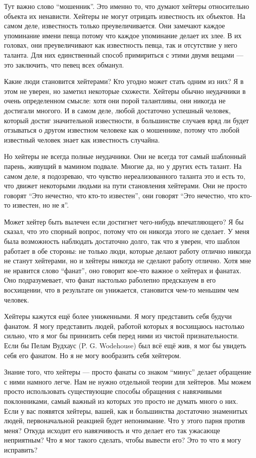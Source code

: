 \documentclass[ebook,12pt,oneside,openany]{memoir}
\begin{document}
Тут важно слово “мошенник”. Это именно то, что думают хейтеры
относительно объекта их ненависти. Хейтеры не могут отрицать
известность их объектов. На самом деле, известность только
преувеличивается. Они замечают каждое упоминание имени певца потому
что каждое упоминание делает их злее. В их головах, они преувеличивают
как известность певца, так и отсутствие у него таланта. Для них
единственный способ примириться с этими двумя вещами — это заключить,
что певец всех обманул.


Какие люди становится хейтерами? Кто угодно может стать одним из них?
Я в этом не уверен, но заметил некоторые схожести. Хейтеры обычно
неудачники в очень определенном смысле: хотя они порой талантливы, они
никогда не достигали многого. И в самом деле, любой достаточно
успешный человек, который достиг значительной известности, в
большинстве случаев вряд ли будет отзываться о другом известном
человеке как о мошеннике, потому что любой известный человек знает как
известность случайна.


Но хейтеры не всегда полные неудачники. Они не всегда тот самый
шаблонный парень, живущий в мамином подвале. Многие да, но у других
есть талант. На самом деле, я подозреваю, что чувство нереализованного
таланта это и есть то, что движет некоторыми людьми на пути
становления хейтерами. Они не просто говорят “Это нечестно, что кто-то
известен”, они говорят “Это нечестно, что кто-то известен, но не я”.


Может хейтер быть вылечен если достигнет чего-нибудь впечатляющего? Я
бы сказал, что это спорный вопрос, потому что он никогда этого не
сделает. У меня была возможность наблюдать достаточно долго, так что я
уверен, что шаблон работает в обе стороны: не только люди, которые
делают работу отлично никогда не станут хейтерами, но и хейтеры
никогда не сделают работу отлично. Хотя мне не нравится слово “фанат”,
оно говорит кое-что важное о хейтерах и фанатах. Оно подразумевает,
что фанат настолько раболепно предсказуем в его восхищении, что в
результате он унижается, становится чем-то меньшим чем человек.


Хейтеры кажутся ещё более униженными. Я могу представить себя будучи
фанатом. Я могу представить людей, работой которых я восхищаюсь
настолько сильно, что я мог бы принизить себя перед ними из чистой
признательности. Если бы Пелам Вудхаус (P. G. Wodehouse) был всё ещё
жив, я мог бы увидеть себя его фанатом. Но я не могу вообразить себя
хейтером.


Знание того, что хейтеры — просто фанаты со знаком “минус” делает
обращение с ними намного легче. Нам не нужно отдельной теории для
хейтеров. Мы можем просто использовать существующие способы обращения
с навязчивыми поклонниками, самый важный из которых это просто не
думать много о них. Если у вас появятся хейтеры, вашей, как и
большинства достаточно знаменитых людей, первоначальной реакцией будет
непонимание. Что у этого парня против меня? Откуда исходит его
навязчивость и что делает его так ужасающе неприятным? Что я мог
такого сделать, чтобы вывести его? Это то что я могу исправить?
\end{document}
